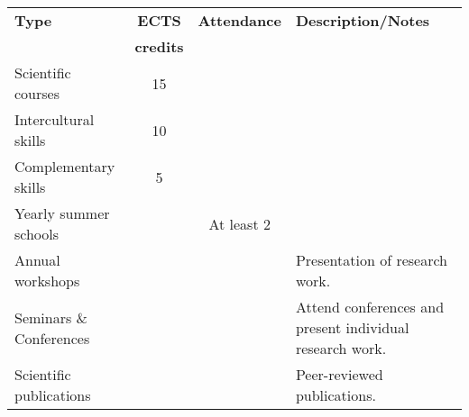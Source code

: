 \begin{table}[h!]
  \centering
  \scriptsize
    \begin{tabularx}{\textwidth}{p{}ccp{}}
    \toprule
  \textbf{Type} & \textbf{ECTS}&\textbf{Attendance}&\textbf{Description/Notes} \\
  & \textbf{credits}&&\\
    \midrule
   Scientific courses&15&&\\
   Intercultural skills&10&&\\
   Complementary skills&5&&\\
   Yearly summer schools&&At least 2&\\
   Annual workshops&&&Presentation of research work.\\
   Seminars \& Conferences&&&Attend conferences and present individual research work.\\
   Scientific publications&&&Peer-reviewed publications.\\
    \bottomrule
    \end{tabularx}%
  \label{tab:docmase_tab}%
\end{table}%